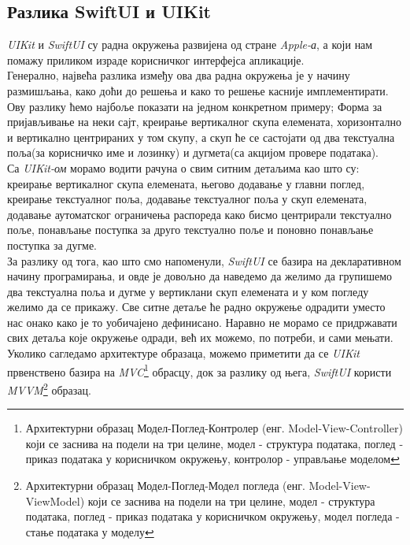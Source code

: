 \documentclass[12pt,oneside]{memoir}
\begin{document}
\subsection{Разлика SwiftUI и UIKit}
\label{subsec:Разлика SwiftUI и UIKit}

\indent \textit{UIKit} и \textit{SwiftUI} су радна окружења развијена од стране \textit{Apple-а}, а који нам помажу приликом израде корисничког интерфејса апликације.
\\
\indent Генерално, највећа разлика између ова два радна окружења је у начину размишљања, како доћи до решења и како то решење касније имплементирати. Ову разлику ћемо најбоље показати на једном конкретном примеру; Форма за пријављивање на неки сајт, креирање вертикалног скупа елемената, хоризонтално и вертикално центрираних у том скупу, а скуп ће се састојати од два текстуална поља(за корисничко име и лозинку) и дугмета(са акцијом провере података).
\\
\indent Са \textit{UIKit-ом} морамо водити рачуна о свим ситним детаљима као што су: креирање вертикалног скупа елемената, његово додавање у главни поглед, креирање текстуалног поља, додавање текстуалног поља у скуп елемената, додавање аутоматског ограничења распореда како бисмо центрирали текстуално поље, понављање поступка за друго текстуално поље и поновно понављање поступка за дугме. 
\\ %
\indent За разлику од тога, као што смо напоменули, \textit{SwiftUI} се базира на декларативном начину програмирања, и овде је довољно да наведемо да желимо да групишемо два текстуална поља и дугме у вертиклани скуп елемената и у ком погледу желимо да се прикажу. Све ситне детаље ће радно окружење одрадити уместо нас онако како је то уобичајено дефинисано. Наравно не морамо се придржавати свих детаља које окружење одради, већ их можемо, по потреби, и сами мењати.
\\
\indent Уколико сагледамо архитектуре образаца, можемо приметити да се \textit{UIKit} првенствено базира на \textit{MVC}\footnote{Архитектурни образац Модел-Поглед-Контролер (енг. Model-View-Controller) који се заснива на подели на три целине, модел - структура података, поглед - приказ података у корисничком окружењу, контролор - управљање моделом} обрасцу, док за разлику од њега, \textit{SwiftUI} користи \textit{MVVM}\footnote{Архитектурни образац Модел-Поглед-Модел погледа (енг. Model-View-ViewModel) који се заснива на подели на три целине, модел - структура података, поглед - приказ података у корисничком окружењу, модел погледа - стање података у моделу} образац.
\end{document}
